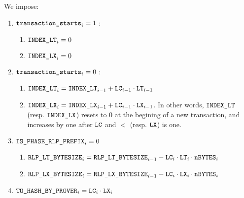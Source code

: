 We impose:
\begin{enumerate}
	\item \If $\texttt{transaction\_starts}_{i} = 1$ \Then:
        \begin{enumerate}
            \item $\texttt{INDEX\_LT}_{i} = 0$ 
            \item $\texttt{INDEX\_LX}_{i} = 0$
        \end{enumerate}
    \item \If $\texttt{transaction\_starts}_{i} = 0$ \Then: 
        \begin{enumerate}
            \item $\texttt{INDEX\_LT}_{i} = \texttt{INDEX\_LT}_{i-1} + \texttt{LC}_{i-1} \cdot \texttt{LT}_{i-1}$ 
            \item $\texttt{INDEX\_LX}_{i} = \texttt{INDEX\_LX}_{i-1} + \texttt{LC}_{i-1} \cdot \texttt{LX}_{i-1}$. In other words, $\texttt{INDEX\_LT}$ (resp. $\texttt{INDEX\_LX}$) resets to 0 at the begining of a new transaction, and increases by one after $\texttt{LC}$ and $\lt$ (resp. $\texttt{LX}$) is one.
        \end{enumerate}
      \item \If $\texttt{IS\_PHASE\_RLP\_PREFIX}_{i} = 0$ \Then
        \begin{enumerate}
            \item $\texttt{RLP\_LT\_BYTESIZE}_{i} = \texttt{RLP\_LT\_BYTESIZE}_{i-1} - \texttt{LC}_{i} \cdot \texttt{LT}_{i} \cdot\texttt{nBYTES}_{i}$
            \item $\texttt{RLP\_LX\_BYTESIZE}_{i} = \texttt{RLP\_LX\_BYTESIZE}_{i-1} - \texttt{LC}_{i} \cdot \texttt{LX}_{i} \cdot\texttt{nBYTES}_{i}$
        \end{enumerate}
        \item $\texttt{TO\_HASH\_BY\_PROVER}_{i} = \texttt{LC}_{i} \cdot \texttt{LX}_{i}$
\end{enumerate}